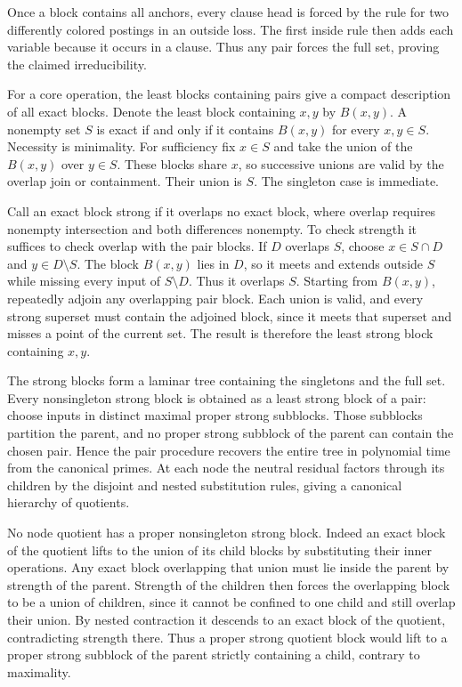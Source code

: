 Once a block contains all anchors, every clause
head is forced by the rule for two differently
colored postings in an outside loss. The first
inside rule then adds each variable because it
occurs in a clause. Thus any pair forces the full
set, proving the claimed irreducibility.

For a core operation, the least blocks containing pairs
give a compact description of all exact blocks. Denote the
least block containing $x,y$ by $B(x,y)$. A nonempty
set $S$ is exact if and only if it contains $B(x,y)$
for every $x,y\in S$. Necessity is minimality. For
sufficiency fix $x\in S$ and take the union of the
$B(x,y)$ over $y\in S$. These blocks share $x$, so
successive unions are valid by the overlap join or
containment. Their union is $S$. The singleton case
is immediate.

Call an exact block strong if it overlaps no exact
block, where overlap requires nonempty intersection
and both differences nonempty. To check strength it
suffices to check overlap with the pair blocks. If
$D$ overlaps $S$, choose $x\in S\cap D$ and
$y\in D\setminus S$. The block $B(x,y)$ lies in $D$,
so it meets and extends outside $S$ while missing
every input of $S\setminus D$. Thus it overlaps $S$.
Starting from $B(x,y)$, repeatedly adjoin any
overlapping pair block. Each union is valid, and
every strong superset must contain the adjoined
block, since it meets that superset and misses a
point of the current set. The result is therefore
the least strong block containing $x,y$.

The strong blocks form a laminar tree containing the
singletons and the full set. Every nonsingleton strong
block is obtained as a least strong block of a pair:
choose inputs in distinct maximal proper strong
subblocks. Those subblocks partition the parent,
and no proper strong subblock of the parent can
contain the chosen pair. Hence the pair procedure
recovers the entire tree in polynomial time from
the canonical primes. At each node the neutral
residual factors through its children by the
disjoint and nested substitution rules, giving a
canonical hierarchy of quotients.

No node quotient has a proper nonsingleton strong
block. Indeed an exact block of the quotient lifts
to the union of its child blocks by substituting
their inner operations. Any exact block overlapping
that union must lie inside the parent by strength
of the parent. Strength of the children then forces
the overlapping block to be a union of children,
since it cannot be confined to one child and still
overlap their union. By nested contraction it
descends to an exact block of the quotient,
contradicting strength there. Thus a proper strong
quotient block would lift to a proper strong
subblock of the parent strictly containing a child,
contrary to maximality.

